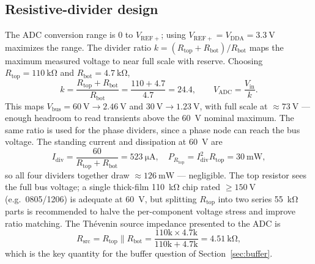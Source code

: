\documentclass[journal,onecolumn,11pt]{IEEEtran}
\newcommand{\Vbus}{V_{\mathrm{bus}}}
\begin{document}
\subsection{Resistive-divider design}\label{sec:divider}
The ADC conversion range is $0$ to $V_{\mathrm{REF+}}$; using
$V_{\mathrm{REF+}}=V_{\mathrm{DDA}}=\SI{3.3}{\volt}$ maximizes the range. The divider ratio
$k=(R_{\mathrm{top}}+R_{\mathrm{bot}})/R_{\mathrm{bot}}$ maps the maximum measured voltage to near
full scale with reserve. Choosing $R_{\mathrm{top}}=\SI{110}{\kilo\ohm}$ and
$R_{\mathrm{bot}}=\SI{4.7}{\kilo\ohm}$,
\begin{equation}
k=\frac{R_{\mathrm{top}}+R_{\mathrm{bot}}}{R_{\mathrm{bot}}}=\frac{110+4.7}{4.7}=24.4,
\qquad V_{\mathrm{ADC}}=\frac{V_{\mathrm{in}}}{k}.
\end{equation}
This maps $\Vbus=\SI{60}{\volt}\to\SI{2.46}{\volt}$ and $\SI{30}{\volt}\to\SI{1.23}{\volt}$, with
full scale at $\approx\SI{73}{\volt}$ --- enough headroom to read transients above the \SI{60}{\volt}
nominal maximum. The same ratio is used for the phase dividers, since a phase node can reach the bus
voltage. The standing current and dissipation at \SI{60}{\volt} are
\begin{equation}
I_{\mathrm{div}}=\frac{60}{R_{\mathrm{top}}+R_{\mathrm{bot}}}=\SI{523}{\micro\ampere},\quad
P_{R_{\mathrm{top}}}=I_{\mathrm{div}}^2R_{\mathrm{top}}=\SI{30}{\milli\watt},
\end{equation}
so all four dividers together draw $\approx\SI{126}{\milli\watt}$ --- negligible. The top resistor
sees the full bus voltage; a single thick-film \SI{110}{\kilo\ohm} chip rated $\ge\SI{150}{\volt}$
(e.g.\ 0805/1206) is adequate at \SI{60}{\volt}, but splitting $R_{\mathrm{top}}$ into two series
\SI{55}{\kilo\ohm} parts is recommended to halve the per-component voltage stress and improve ratio
matching. The Th\'evenin source impedance presented to the ADC is
\begin{equation}
R_{\mathrm{src}}=R_{\mathrm{top}}\parallel R_{\mathrm{bot}}
   =\frac{110\text{k}\times4.7\text{k}}{110\text{k}+4.7\text{k}}=\SI{4.51}{\kilo\ohm},
\label{eq:rsrc}
\end{equation}
which is the key quantity for the buffer question of Section~\ref{sec:buffer}.
\end{document}
